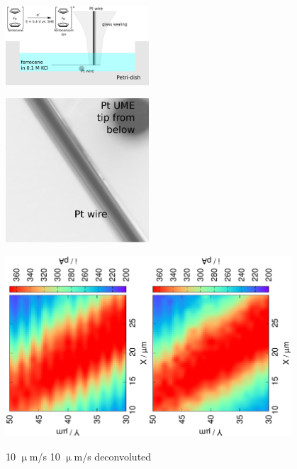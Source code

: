 \documentclass{beamer}
\begin{document}
\begin{frame}[plain]

        \centering
        \includegraphics[width=0.4\textwidth]{wire.eps}
\vfill
\end{frame}

\begin{frame}[plain]

        \centering
        \includegraphics[width=0.4\textwidth]{wire_photo.eps}
\vfill
\end{frame}


\begin{frame}[plain]

        \centering
        \includegraphics[trim = 10mm 10mm 0mm 10mm, clip, width=0.4\textwidth, angle=-90]{7.eps}\includegraphics[trim = 10mm 30mm 0mm 10mm, clip, width=0.4\textwidth, angle=-90]{7_deconvoluted.eps}

\hspace{1.4cm} 10 $\upmu$m/s \hspace{3cm} 10 $\upmu$m/s deconvoluted

\vfill
\end{frame}
\end{document}
